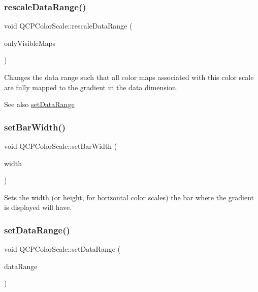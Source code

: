 \mbox{\label{class_q_c_p_color_scale_a425983db4478543924ddbd04ea20a356}} 
\subsubsection{\texorpdfstring{rescaleDataRange()}{rescaleDataRange()}}
{\footnotesize\ttfamily void Q\+C\+P\+Color\+Scale\+::rescale\+Data\+Range (\begin{DoxyParamCaption}\item[{bool}]{only\+Visible\+Maps }\end{DoxyParamCaption})}

Changes the data range such that all color maps associated with this color scale are fully mapped to the gradient in the data dimension.

\begin{DoxySeeAlso}{See also}
\mbox{\hyperlink{class_q_c_p_color_scale_abe88633003a26d1e756aa74984587fef}{set\+Data\+Range}} 
\end{DoxySeeAlso}
\mbox{\label{class_q_c_p_color_scale_ab9dcc0c1cd583477496209b1413bcb99}} 
\subsubsection{\texorpdfstring{setBarWidth()}{setBarWidth()}}
{\footnotesize\ttfamily void Q\+C\+P\+Color\+Scale\+::set\+Bar\+Width (\begin{DoxyParamCaption}\item[{int}]{width }\end{DoxyParamCaption})}

Sets the width (or height, for horizontal color scales) the bar where the gradient is displayed will have. \mbox{\label{class_q_c_p_color_scale_abe88633003a26d1e756aa74984587fef}} 
\subsubsection{\texorpdfstring{setDataRange()}{setDataRange()}}
{\footnotesize\ttfamily void Q\+C\+P\+Color\+Scale\+::set\+Data\+Range (\begin{DoxyParamCaption}\item[{const \mbox{\hyperlink{class_q_c_p_range}{Q\+C\+P\+Range}} \&}]{data\+Range }\end{DoxyParamCaption})}

